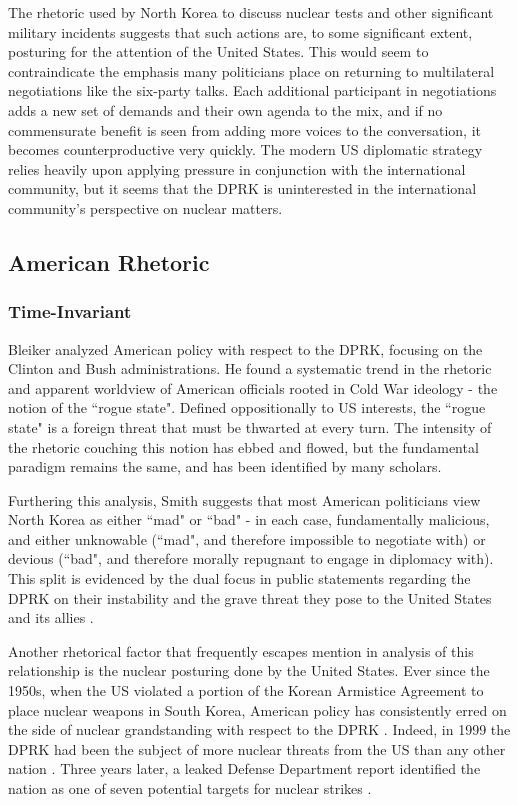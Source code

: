 \documentclass{article}
\begin{document}
The rhetoric used by North Korea to discuss nuclear tests and other significant military incidents suggests that such actions are, to some significant extent, posturing for the attention of the United States. This would seem to contraindicate the emphasis many politicians place on returning to multilateral negotiations like the six-party talks. Each additional participant in negotiations adds a new set of demands and their own agenda to the mix, and if no commensurate benefit is seen from adding more voices to the conversation, it becomes counterproductive very quickly. The modern US diplomatic strategy relies heavily upon applying pressure in conjunction with the international community, but it seems that the DPRK is uninterested in the international community's perspective on nuclear matters.


\subsection{American Rhetoric}
\subsubsection{Time-Invariant}

Bleiker \cite{bleiker} analyzed American policy with respect to the DPRK, focusing on the Clinton and Bush administrations. He found a systematic trend in the rhetoric and apparent worldview of American officials rooted in Cold War ideology - the notion of the ``rogue state". Defined oppositionally to US interests, the ``rogue state" is a foreign threat that must be thwarted at every turn. The intensity of the rhetoric couching this notion has ebbed and flowed, but the fundamental paradigm remains the same, and has been identified by many scholars\cite{bleiker,cumings,sigal,smith}.

Furthering this analysis, Smith suggests that most American politicians view North Korea as either ``mad" or ``bad" - in each case, fundamentally malicious, and either unknowable (``mad", and therefore impossible to negotiate with) or devious (``bad", and therefore morally repugnant to engage in diplomacy with). This split is evidenced by the dual focus in public statements regarding the DPRK on their instability and the grave threat they pose to the United States and its allies \cite{smith}. 

Another rhetorical factor that frequently escapes mention in analysis of this relationship is the nuclear posturing done by the United States. Ever since the 1950s, when the US violated a portion of the Korean Armistice Agreement to place nuclear weapons in South Korea, American policy has consistently erred on the side of nuclear grandstanding with respect to the DPRK \cite{cumings}. Indeed, in 1999 the DPRK had been the subject of more nuclear threats from the US than any other nation \cite{sigal}. Three years later, a leaked Defense Department report identified the nation as one of seven potential targets for nuclear strikes \cite{harnisch}.
\end{document}
